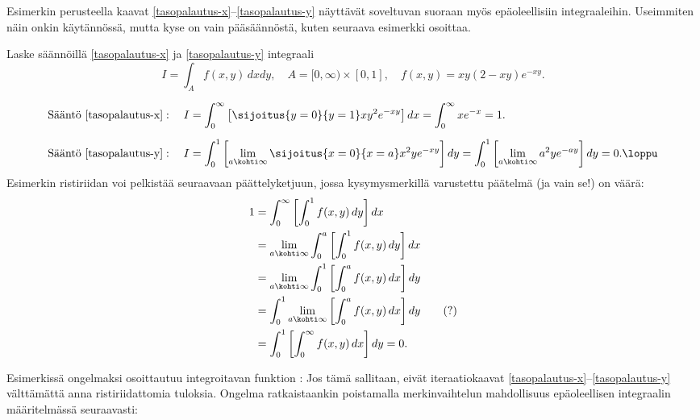 Esimerkin perusteella kaavat \eqref{tasopalautus-x}--\eqref{tasopalautus-y} näyttävät soveltuvan
suoraan myös epäoleellisiin integraaleihin. Useimmiten näin onkin käytännössä, mutta kyse on
vain pääsäännöstä, kuten seuraava esimerkki osoittaa.
\begin{Exa} Laske säännöillä \eqref{tasopalautus-x} ja \eqref{tasopalautus-y} integraali
\[
I=\int_A f(x,y)\,dxdy, \quad A=[0,\infty)\times[0,1], \quad f(x,y)=xy(2-xy)e^{-xy}.
\]
\end{Exa}
\ratk
\begin{align*}
\text{Sääntö \eqref{tasopalautus-x}}: \quad 
I &= \int_0^\infty \left[ \sijoitus{y=0}{y=1} xy^2e^{-xy}\right]dx
   =\int_0^\infty xe^{-x}=1. \\[2mm]
\text{Sääntö \eqref{tasopalautus-y}}: \quad 
I &= \int_0^1 \left[\lim_{a\kohti\infty}\sijoitus{x=0}{x=a} x^2ye^{-xy}\right]dy
   =\int_0^1 \left[\lim_{a\kohti\infty} a^2ye^{-ay}\right]dy=0. \loppu
\end{align*}
Esimerkin ristiriidan voi pelkistää seuraavaan päättelyketjuun, jossa kysymysmerkillä varustettu
päätelmä (ja vain se!) on väärä:
\begin{align*}
1 &= \int_0^\infty \left[\int_0^1 f(x,y)\,dy\right]dx \\
  &= \lim_{a\kohti\infty} \int_0^a \left[\int_0^1 f(x,y)\,dy\right]dx \\
  &= \lim_{a\kohti\infty} \int_0^1 \left[\int_0^a f(x,y)\,dx\right]dy \\
  &= \int_0^1 \lim_{a\kohti\infty} \left[\int_0^a f(x,y)\,dx\right]dy \qquad \text{(?)} \\
  &= \int_0^1 \left[\int_0^\infty f(x,y)\,dx\right]dy = 0.
\end{align*}

Esimerkissä ongelmaksi osoittautuu integroitavan funktion : Jos tämä
sallitaan, eivät iteraatiokaavat \eqref{tasopalautus-x}--\eqref{tasopalautus-y} välttämättä anna
ristiriidattomia tuloksia. Ongelma ratkaistaankin poistamalla merkinvaihtelun mahdollisuus
epäoleellisen integraalin määritelmässä seuraavasti: 

